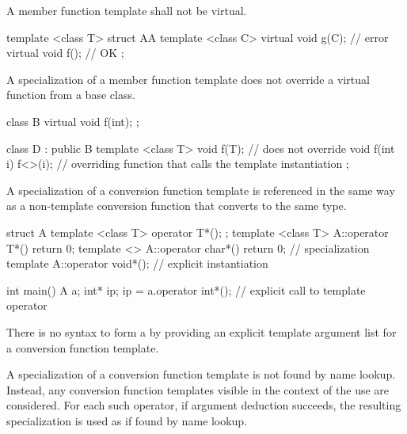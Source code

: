 \pnum
A member function template shall not be virtual.
\begin{example}

\begin{codeblock}
template <class T> struct AA {
  template <class C> virtual void g(C);             // error
  virtual void f();                                 // OK
};
\end{codeblock}
\end{example}

\pnum
A specialization of
a member function template does not override a virtual function from a
base class.
\begin{example}
\begin{codeblock}
class B {
  virtual void f(int);
};

class D : public B {
  template <class T> void f(T); // does not override 
  void f(int i) { f<>(i); }     // overriding function that calls the template instantiation
};
\end{codeblock}
\end{example}

\pnum
A specialization of a
conversion function template
is referenced in
the same way as a non-template conversion function that converts to
the same type.
\begin{example}

\begin{codeblock}
struct A {
  template <class T> operator T*();
};
template <class T> A::operator T*(){ return 0; }
template <> A::operator char*(){ return 0; }        // specialization
template A::operator void*();                       // explicit instantiation

int main() {
  A a;
  int* ip;
  ip = a.operator int*();       // explicit call to template operator 
}
\end{codeblock}
\end{example}
\begin{note}
There is no syntax to form a 
by providing an explicit template argument list
for a conversion function template.
\end{note}

\pnum
A specialization of a
conversion function template
is not found by name
lookup.
Instead, any
conversion function templates
visible in the
context of the use are considered.
For each such operator, if argument
deduction succeeds, the resulting specialization is
used as if found by name lookup.

